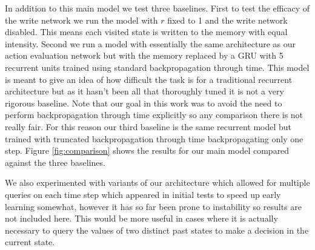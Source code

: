 \documentclass{article}
\begin{document}
In addition to this main model we test three baselines. First to test the efficacy of the write network we run the model with $r$ fixed to 1 and the write network disabled. This means each visited state is written to the memory with equal intensity. Second we run a model with essentially the same architecture as our action evaluation network but with the memory replaced by a GRU with 5 recurrent units trained using standard backpropagation through time. This model is meant to give an idea of how difficult the task is for a traditional recurrent architecture but as it hasn't been all that thoroughly tuned it is not a very rigorous baseline. Note that our goal in this work was to avoid the need to perform backpropagation through time explicitly so any comparison there is not really fair. For this reason our third baseline is the same recurrent model but trained with truncated backpropagation through time backpropagating only one step. Figure \ref{fig:comparison} shows  the results for our main model compared against the three baselines.

We also experimented with variants of our architecture which allowed for multiple queries on each time step which appeared in initial tests to speed up early learning somewhat, however it has so far been prone to instability so results are not included here. This would be more useful in cases where it is actually necessary to query the values of two distinct past states to make a decision in the current state.
\end{document}
